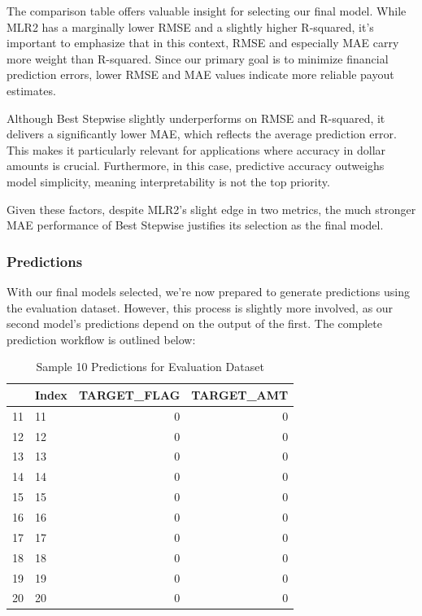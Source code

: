 \documentclass[
]{article}
\begin{document}
The comparison table offers valuable insight for selecting our final
model. While MLR2 has a marginally lower RMSE and a slightly higher
R-squared, it's important to emphasize that in this context, RMSE and
especially MAE carry more weight than R-squared. Since our primary goal
is to minimize financial prediction errors, lower RMSE and MAE values
indicate more reliable payout estimates.

Although Best Stepwise slightly underperforms on RMSE and R-squared, it
delivers a significantly lower MAE, which reflects the average
prediction error. This makes it particularly relevant for applications
where accuracy in dollar amounts is crucial. Furthermore, in this case,
predictive accuracy outweighs model simplicity, meaning interpretability
is not the top priority.

Given these factors, despite MLR2's slight edge in two metrics, the much
stronger MAE performance of Best Stepwise justifies its selection as the
final model.

\subsubsection{Predictions}\label{predictions}

With our final models selected, we're now prepared to generate
predictions using the evaluation dataset. However, this process is
slightly more involved, as our second model's predictions depend on the
output of the first. The complete prediction workflow is outlined below:

\begin{table}[H]
\centering\centering
\caption{\label{tab:unnamed-chunk-15}Sample 10 Predictions for Evaluation Dataset}
\centering
\begin{tabular}[t]{l|l|r|r}
\hline
  & Index & TARGET\_FLAG & TARGET\_AMT\\
\hline
11 & 11 & 0 & 0\\
\hline
12 & 12 & 0 & 0\\
\hline
13 & 13 & 0 & 0\\
\hline
14 & 14 & 0 & 0\\
\hline
15 & 15 & 0 & 0\\
\hline
16 & 16 & 0 & 0\\
\hline
17 & 17 & 0 & 0\\
\hline
18 & 18 & 0 & 0\\
\hline
19 & 19 & 0 & 0\\
\hline
20 & 20 & 0 & 0\\
\hline
\end{tabular}
\end{table}
\end{document}
